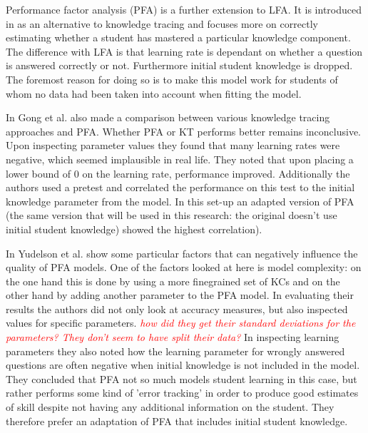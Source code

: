 \documentclass{scrartcl}
\newcommand\todo[1]{\textit{\textcolor{red}{#1}}}
\begin{document}
Performance factor analysis (PFA) is a further extension to LFA. It is introduced in \cite{pfa} as an alternative to knowledge tracing and focuses more on correctly estimating whether a student has mastered a particular knowledge component. The difference with LFA is that learning rate is dependant on whether a question is answered correctly or not. Furthermore initial student knowledge is dropped. The foremost reason for doing so is to make this model work for students of whom no data had been taken into account when fitting the model.

In \cite{ktpfa} Gong et al. also made a comparison between various knowledge tracing approaches and PFA. Whether PFA or KT performs better remains inconclusive. Upon inspecting parameter values they found that many learning rates were negative, which seemed implausible in real life. They noted that upon placing a lower bound of 0 on the learning rate, performance improved.  Additionally the authors used a pretest and correlated the performance on this test to the initial knowledge parameter from the model. In this set-up an adapted version of PFA (the same version that will be used in this research: the original doesn't use initial student knowledge) showed the highest correlation).

In \cite{blackart} Yudelson et al. show some particular factors that can negatively influence the quality of PFA models. One of the factors looked at here is model complexity: on the one hand this is done by using a more finegrained set of KCs and on the other hand by adding another parameter to the PFA model. In evaluating their results the authors did not only look at accuracy measures, but also inspected values for specific parameters. \todo{how did they get their standard deviations for the parameters? They don't seem to have split their data?} In inspecting learning parameters they also noted how the learning parameter for wrongly answered questions are often negative when initial knowledge is not included in the model. They concluded that PFA not so much models student learning in this case, but rather performs some kind of 'error tracking' in order to produce good estimates of skill despite not having any additional information on the student. They therefore prefer an adaptation of PFA that includes initial student knowledge.
\end{document}
